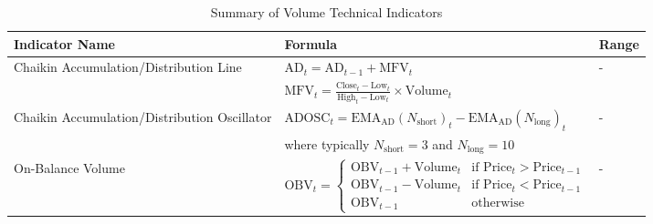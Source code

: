 \begin{table}[htb!]
\caption{Summary of Volume Technical Indicators}
\label{Tables:VolumeIndicators}
\centering
\footnotesize
\begin{tabularx}{\textwidth}{@{}lXl@{}}
\toprule
\textbf{Indicator Name} & \textbf{Formula} & \textbf{Range} \\ 
\midrule
Chaikin Accumulation/Distribution Line & $\text{AD}_t = \text{AD}_{t-1} + \text{MFV}_t$ & - \\
\addlinespace
& $\text{MFV}_t = \frac{\text{Close}_t - \text{Low}_t}{\text{High}_t - \text{Low}_t} \times \text{Volume}_t$ & \\
\addlinespace
Chaikin Accumulation/Distribution Oscillator & $\text{ADOSC}_t = \text{EMA}_\text{AD}(N_{\text{short}})_t - \text{EMA}_\text{AD}(N_{\text{long}})_t$ & - \\
\addlinespace
& where typically $N_{\text{short}} = 3$ and $N_{\text{long}} = 10$ & \\
\addlinespace
On-Balance Volume & $\text{OBV}_t = 
\begin{cases} 
\text{OBV}_{t-1} + \text{Volume}_t & \text{if } \text{Price}_t > \text{Price}_{t-1} \\
\text{OBV}_{t-1} - \text{Volume}_t & \text{if } \text{Price}_t < \text{Price}_{t-1} \\
\text{OBV}_{t-1} & \text{otherwise}
\end{cases}$ & - \\
\bottomrule
\end{tabularx}
\end{table}
